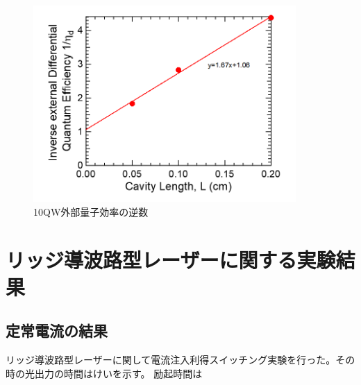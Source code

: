 \begin{figure}[htbp]
	\centering
	\includegraphics[width=10cm]{figure/fig_3_1_10QW_broadcontact_id_inverse.png}
	\caption{10QW外部量子効率の逆数}
	\label{fig:fig_3_1_10QW_broadcontact_id_inverse}
\end{figure}

\newpage
\newpage
\newpage
\section{リッジ導波路型レーザーに関する実験結果}%
\subsection{定常電流の結果}
リッジ導波路型レーザーに関して電流注入利得スイッチング実験を行った。その時の光出力の時間はけいを示す。
励起時間は
